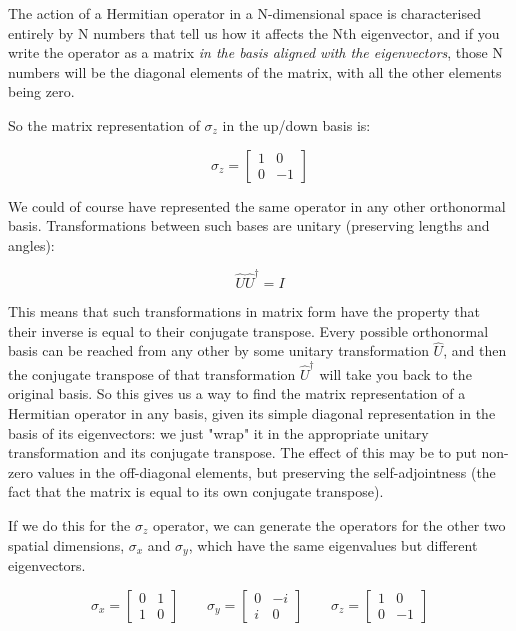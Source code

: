 The action of a Hermitian operator in a N-dimensional space is characterised entirely by N numbers that tell us how it affects the Nth eigenvector, and if you write the operator as a matrix \textit{in the basis aligned with the eigenvectors}, those N numbers will be the diagonal elements of the matrix, with all the other elements being zero.

So the matrix representation of $\sigma_z$ in the up/down basis is:

$$
\sigma_z = 
\begin{bmatrix} 1 & 0 \\ 0 & -1 \end{bmatrix}
$$

We could of course have represented the same operator in any other orthonormal basis. Transformations between such bases are unitary (preserving lengths and angles):

$$\hat{U} \hat{U}^\dagger = I$$

This means that such transformations in matrix form have the property that their inverse is equal to their conjugate transpose. Every possible orthonormal basis can be reached from any other by some unitary transformation $\hat{U}$, and then the conjugate transpose of that transformation $\hat{U}^\dagger$ will take you back to the original basis. So this gives us a way to find the matrix representation of a Hermitian operator in any basis, given its simple diagonal representation in the basis of its eigenvectors: we just "wrap" it in the appropriate unitary transformation and its conjugate transpose. The effect of this may be to put non-zero values in the off-diagonal elements, but preserving the self-adjointness (the fact that the matrix is equal to its own conjugate transpose).

If we do this for the $\sigma_z$ operator, we can generate the operators for the other two spatial dimensions, $\sigma_x$ and $\sigma_y$, which have the same eigenvalues but different eigenvectors.

$$
\sigma_x = \begin{bmatrix} 0 & 1 \\ 1 & 0 \end{bmatrix}
\qquad
\sigma_y = \begin{bmatrix} 0 & -i \\ i & 0 \end{bmatrix}
\qquad
\sigma_z = \begin{bmatrix} 1 & 0 \\ 0 & -1 \end{bmatrix}
$$

